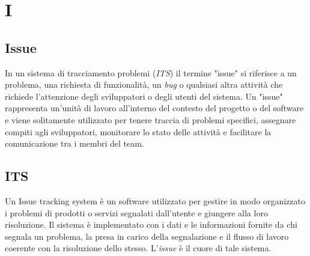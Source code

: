 \chapter{I}

\section{Issue}\label{sec:Issues}
In un sistema di tracciamento problemi (\emph{ITS}) il termine "issue" si riferisce a un problema, una richiesta di funzionalità, un \emph{bug} o qualsiasi altra attività che richiede l'attenzione degli sviluppatori o degli utenti del sistema. Un "issue" rappresenta un'unità di lavoro all'interno del contesto del progetto o del software e viene solitamente utilizzato per tenere traccia di problemi specifici, assegnare compiti agli sviluppatori, monitorare lo stato delle attività e facilitare la comunicazione tra i membri del team.

\section{ITS}\label{sec:Issue Tracking System}
Un Issue tracking system è un software utilizzato per gestire in modo organizzato i problemi di prodotti o servizi segnalati dall’utente e giungere alla loro risoluzione. Il sistema è implementato con i dati e le informazioni fornite da chi segnala un problema, la presa in carico della segnalazione e il flusso di lavoro coerente con la risoluzione dello stesso. L'\emph{issue} è il cuore di tale sistema.
